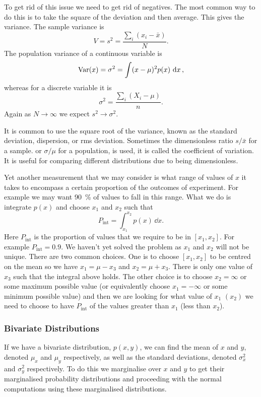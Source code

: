     To get rid of this issue we need to get rid of negatives.
    The most common way to do this is to take the square of the deviation and then average.
    This gives the variance.
    The sample variance is
    \[V = s^2 = \frac{\sum_i (x_i - \bar{x})}{N}.\]
    The population variance of a continuous variable is
    \[\operatorname{Var}(x) = \sigma^2 = \int (x - \mu)^2p(x)\,\dd{x},\]
    whereas for a discrete variable it is
    \[\sigma^2 = \frac{\sum_i (X_i - \mu)}{n}.\]
    Again as \(N\to\infty\) we expect \(s^2 \to \sigma^2\).
    
    It is common to use the square root of the variance, known as the standard deviation, dispersion, or \acrfull{rms} deviation.
    Sometimes the dimensionless ratio \(s/\bar{x}\) for a sample. or \(\sigma/\mu\) for a population, is used, it is called the coefficient of variation.
    It is useful for comparing different distributions due to being dimensionless.
    
    Yet another measurement that we may consider is what range of values of \(x\) it takes to encompass a certain proportion of the outcomes of experiment.
    For example we may want \SI{90}{\percent} of values to fall in this range.
    What we do is integrate \(p(x)\) and choose \(x_1\) and \(x_2\) such that
    \[P_\mathrm{int} = \int_{x_1}^{x_2}p(x)\,\dd{x}.\]
    Here \(P_\mathrm{int}\) is the proportion of values that we require to be in \([x_1, x_2]\).
    For example \(P_\mathrm{int} = 0.9\).
    We haven't yet solved the problem as \(x_1\) and \(x_2\) will not be unique.
    There are two common choices.
    One is to choose \([x_1, x_2]\) to be centred on the mean so we have \(x_1 = \mu - x_3\) and \(x_2 = \mu + x_3\).
    There is only one value of \(x_3\) such that the integral above holds.
    The other choice is to choose \(x_2 = \infty\) or some maximum possible value (or equivalently choose \(x_1 = -\infty\) or some minimum possible value) and then we are looking for what value of \(x_1\) \((x_2)\) we need to choose to have \(P_\mathrm{int}\) of the values greater than \(x_1\) (less than \(x_2\)).
    
    
    \subsubsection{Bivariate Distributions}
    If we have a bivariate distribution, \(p(x, y)\), we can find the mean of \(x\) and \(y\), denoted \(\mu_x\) and \(\mu_y\) respectively, as well as the standard deviations, denoted \(\sigma_x^2\) and \(\sigma_y^2\) respectively.
    To do this we marginalise over \(x\) and \(y\) to get their marginalised probability distributions and proceeding with the normal computations using these marginalised distributions.
    
